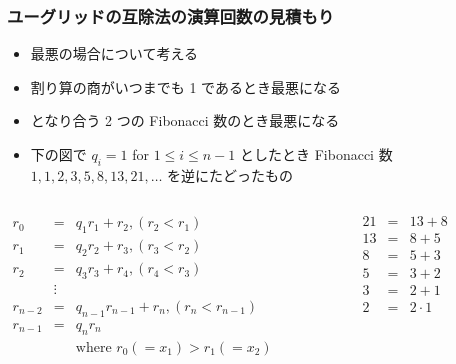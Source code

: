 \begin{frame}[fragile]
\frametitle{ユーグリッドの互除法の演算回数の見積もり}
  \begin{itemize}
\item 最悪の場合について考える
\item 割り算の商がいつまでも 1 であるとき最悪になる
\item となり合う 2 つの Fibonacci 数のとき最悪になる
\item 下の図で $q_i=1$ for \(1\le i\le n-1\) としたとき Fibonacci 数 \(1,1,2,3,5,8,13,21,\ldots\) を逆にたどったもの
  \end{itemize}
  \begin{columns}[t]
    \begin{column}{0.45\textwidth}
\centering
      \begin{math}
        \begin{array}{rcl}
r_0 &=& q_1 r_1 + r_2, (r_2<r_1)\\
r_1 &=& q_2 r_2 + r_3, (r_3<r_2)\\
r_2 &=& q_3 r_3 + r_4, (r_4<r_3)\\
&\vdots&\\
r_{n-2} &=& q_{n-1}r_{n-1} + r_{n}, (r_n<r_{n-1})\\
r_{n-1} &=& q_{n}r_{n}\\
&&\mbox{where } r_0(=x_1)>r_1(=x_2)
        \end{array}
      \end{math}
    \end{column}
    \begin{column}{0.45\textwidth}
\centering
      \begin{math}
        \begin{array}{rcl}
21 &=& 13 + 8\\
13 &=& 8 + 5\\
 8 &=& 5 + 3\\
 5 &=& 3 + 2\\
 3 &=& 2 + 1\\
 2 &=& 2 \cdot 1
        \end{array}
      \end{math}
    \end{column}
  \end{columns}
\end{frame}
\newcommand{\fib}{\mathop{\mathrm{fib}}\nolimits}
